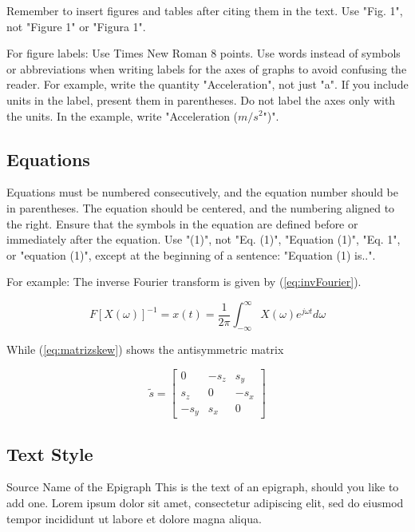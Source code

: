 \documentclass[letterpaper]{EmergentUDB}
\begin{document}
Remember to insert figures and tables after citing them in the text. Use "Fig. 1", not "Figure 1" or "Figura 1".

For figure labels: Use Times New Roman 8 points. Use words instead of symbols or abbreviations when writing labels for the axes of graphs to avoid confusing the reader. For example, write the quantity "Acceleration", not just "a". If you include units in the label, present them in parentheses. Do not label the axes only with the units. In the example, write "Acceleration ($m/s^2$")".

\subsection{Equations}
Equations must be numbered consecutively, and the equation number should be in parentheses. The equation should be centered, and the numbering aligned to the right. Ensure that the symbols in the equation are defined before or immediately after the equation. Use "(1)", not "Eq. (1)", "Equation (1)", "Eq. 1", or "equation (1)", except at the beginning of a sentence: "Equation (1) is..".

For example: The inverse Fourier transform is given by (\ref{eq:invFourier}).

\begin{equation} \label{eq:invFourier}
    F[X(\omega)]^{-1}=x(t)=\frac{1}{2\pi}\int_{-\infty}^{\infty}X(\omega) e^{j\omega t} d\omega
\end{equation}

While (\ref{eq:matrizskew}) shows the antisymmetric matrix

\begin{equation} \label{eq:matrizskew}
\tilde{s}=\begin{bmatrix}0&-s_z&s_y\\ s_z&0&-s_x\\-s_y&s_x&0\end{bmatrix}
\end{equation}

\subsection{Text Style}
\begin{epigraph}{Source Name of the Epigraph}
This is the text of an epigraph, should you like to add one. Lorem ipsum dolor sit amet, consectetur adipiscing elit, sed do eiusmod tempor incididunt ut labore et dolore magna aliqua. 
\end{epigraph}
\end{document}
